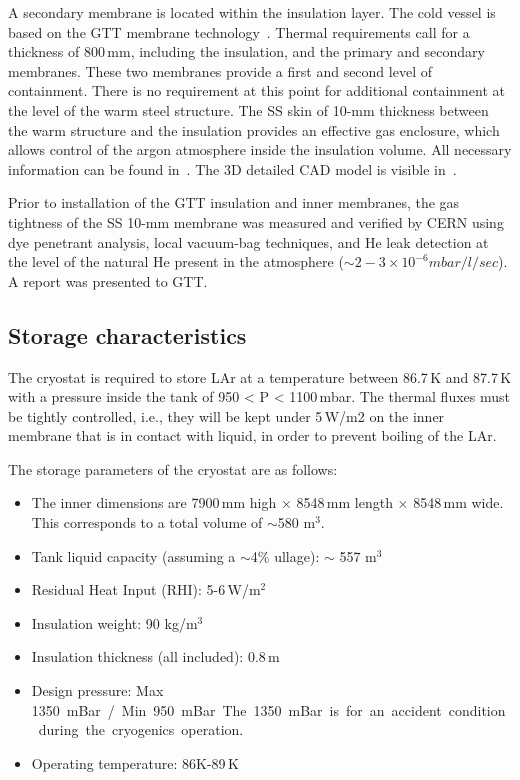A secondary membrane is located within the insulation layer. The cold vessel is based on the GTT membrane technology~\cite{gtt}.   Thermal requirements call for 
a thickness of 800\,mm, including the insulation, and the primary and secondary membranes. These two membranes provide a first and second level of containment. There is no requirement at this point for additional containment at the level of the warm steel structure. The SS skin of 10-mm thickness between the warm structure and the insulation provides an effective gas enclosure, which allows control of the argon atmosphere inside the insulation volume.
All necessary information can be found in~\cite{edms1}. 
The 3D detailed CAD model is visible in~\cite{edms2}. 

Prior to installation of the GTT insulation and %
inner membranes, the gas tightness of the SS 10-mm membrane was measured and verified by CERN using dye penetrant analysis, local vacuum-bag techniques, and He leak %
detection at the level of the natural He present in the atmosphere ($\sim2-3 \times 10^{-6} mbar/l/sec$). A report was presented to GTT. 

\subsection{Storage characteristics}


The 
cryostat is required to store LAr at a temperature between 86.7\,K and 87.7\,K with a pressure inside the 
tank of 950 < P < 1100\,mbar. %
The thermal fluxes must be tightly controlled, i.e., %
they will be kept under 5\,W/m2 on %
the inner membrane that is in contact with liquid, in order to prevent boiling of the LAr.

The storage parameters of the cryostat are as follows:
\begin{itemize} %
\item The inner dimensions are 7900\,mm high $\times$ 8548\,mm length $\times$ 8548\,mm wide.  This corresponds to a total volume of $\sim$580 m$^3$. 
\item Tank liquid capacity (assuming a $\sim$4\% ullage): $\sim$ 557 m$^3$
\item Residual Heat Input (RHI): 5-6\,W/m$^2$
\item Insulation weight: 90 kg/m$^3$  
\item Insulation thickness (all included): 0.8\,m 
\item Design pressure: Max \SI{1350} mBar / Min 950 mBar.  The \SI{1350} mBar is for an accident condition during the cryogenics operation.
\item Operating temperature: 86K-89\,K
\end{itemize}

